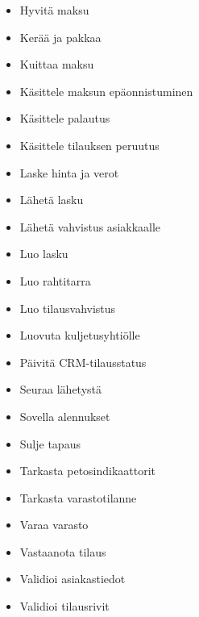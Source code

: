\documentclass[
  finnish,
  letterpaper,
  DIV=11,
  numbers=noendperiod,
  oneside]{scrreprt}
\providecommand{\tightlist}{%
  \setlength{\itemsep}{0pt}\setlength{\parskip}{0pt}}
\begin{document}
\begin{itemize}
\tightlist
\item
  Hyvitä maksu
\item
  Kerää ja pakkaa
\item
  Kuittaa maksu
\item
  Käsittele maksun epäonnistuminen
\item
  Käsittele palautus
\item
  Käsittele tilauksen peruutus
\item
  Laske hinta ja verot
\item
  Lähetä lasku
\item
  Lähetä vahvistus asiakkaalle
\item
  Luo lasku
\item
  Luo rahtitarra
\item
  Luo tilausvahvistus
\item
  Luovuta kuljetusyhtiölle
\item
  Päivitä CRM-tilausstatus
\item
  Seuraa lähetystä
\item
  Sovella alennukset
\item
  Sulje tapaus
\item
  Tarkasta petosindikaattorit
\item
  Tarkasta varastotilanne
\item
  Varaa varasto
\item
  Vastaanota tilaus
\item
  Validioi asiakastiedot
\item
  Validioi tilausrivit
\end{itemize}
\end{document}
